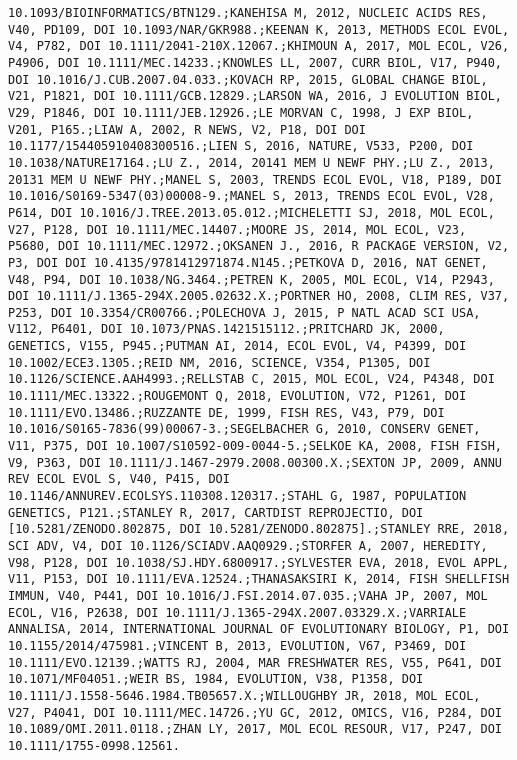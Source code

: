 \documentclass[]{article}
\begin{document}
\begin{verbatim}
10.1093/BIOINFORMATICS/BTN129.;KANEHISA M, 2012, NUCLEIC ACIDS RES, V40, PD109, DOI 10.1093/NAR/GKR988.;KEENAN K, 2013, METHODS ECOL EVOL, V4, P782, DOI 10.1111/2041-210X.12067.;KHIMOUN A, 2017, MOL ECOL, V26, P4906, DOI 10.1111/MEC.14233.;KNOWLES LL, 2007, CURR BIOL, V17, P940, DOI 10.1016/J.CUB.2007.04.033.;KOVACH RP, 2015, GLOBAL CHANGE BIOL, V21, P1821, DOI 10.1111/GCB.12829.;LARSON WA, 2016, J EVOLUTION BIOL, V29, P1846, DOI 10.1111/JEB.12926.;LE MORVAN C, 1998, J EXP BIOL, V201, P165.;LIAW A, 2002, R NEWS, V2, P18, DOI DOI 10.1177/154405910408300516.;LIEN S, 2016, NATURE, V533, P200, DOI 10.1038/NATURE17164.;LU Z., 2014, 20141 MEM U NEWF PHY.;LU Z., 2013, 20131 MEM U NEWF PHY.;MANEL S, 2003, TRENDS ECOL EVOL, V18, P189, DOI 10.1016/S0169-5347(03)00008-9.;MANEL S, 2013, TRENDS ECOL EVOL, V28, P614, DOI 10.1016/J.TREE.2013.05.012.;MICHELETTI SJ, 2018, MOL ECOL, V27, P128, DOI 10.1111/MEC.14407.;MOORE JS, 2014, MOL ECOL, V23, P5680, DOI 10.1111/MEC.12972.;OKSANEN J., 2016, R PACKAGE VERSION, V2, P3, DOI DOI 10.4135/9781412971874.N145.;PETKOVA D, 2016, NAT GENET, V48, P94, DOI 10.1038/NG.3464.;PETREN K, 2005, MOL ECOL, V14, P2943, DOI 10.1111/J.1365-294X.2005.02632.X.;PORTNER HO, 2008, CLIM RES, V37, P253, DOI 10.3354/CR00766.;POLECHOVA J, 2015, P NATL ACAD SCI USA, V112, P6401, DOI 10.1073/PNAS.1421515112.;PRITCHARD JK, 2000, GENETICS, V155, P945.;PUTMAN AI, 2014, ECOL EVOL, V4, P4399, DOI 10.1002/ECE3.1305.;REID NM, 2016, SCIENCE, V354, P1305, DOI 10.1126/SCIENCE.AAH4993.;RELLSTAB C, 2015, MOL ECOL, V24, P4348, DOI 10.1111/MEC.13322.;ROUGEMONT Q, 2018, EVOLUTION, V72, P1261, DOI 10.1111/EVO.13486.;RUZZANTE DE, 1999, FISH RES, V43, P79, DOI 10.1016/S0165-7836(99)00067-3.;SEGELBACHER G, 2010, CONSERV GENET, V11, P375, DOI 10.1007/S10592-009-0044-5.;SELKOE KA, 2008, FISH FISH, V9, P363, DOI 10.1111/J.1467-2979.2008.00300.X.;SEXTON JP, 2009, ANNU REV ECOL EVOL S, V40, P415, DOI 10.1146/ANNUREV.ECOLSYS.110308.120317.;STAHL G, 1987, POPULATION GENETICS, P121.;STANLEY R, 2017, CARTDIST REPROJECTIO, DOI [10.5281/ZENODO.802875, DOI 10.5281/ZENODO.802875].;STANLEY RRE, 2018, SCI ADV, V4, DOI 10.1126/SCIADV.AAQ0929.;STORFER A, 2007, HEREDITY, V98, P128, DOI 10.1038/SJ.HDY.6800917.;SYLVESTER EVA, 2018, EVOL APPL, V11, P153, DOI 10.1111/EVA.12524.;THANASAKSIRI K, 2014, FISH SHELLFISH IMMUN, V40, P441, DOI 10.1016/J.FSI.2014.07.035.;VAHA JP, 2007, MOL ECOL, V16, P2638, DOI 10.1111/J.1365-294X.2007.03329.X.;VARRIALE ANNALISA, 2014, INTERNATIONAL JOURNAL OF EVOLUTIONARY BIOLOGY, P1, DOI 10.1155/2014/475981.;VINCENT B, 2013, EVOLUTION, V67, P3469, DOI 10.1111/EVO.12139.;WATTS RJ, 2004, MAR FRESHWATER RES, V55, P641, DOI 10.1071/MF04051.;WEIR BS, 1984, EVOLUTION, V38, P1358, DOI 10.1111/J.1558-5646.1984.TB05657.X.;WILLOUGHBY JR, 2018, MOL ECOL, V27, P4041, DOI 10.1111/MEC.14726.;YU GC, 2012, OMICS, V16, P284, DOI 10.1089/OMI.2011.0118.;ZHAN LY, 2017, MOL ECOL RESOUR, V17, P247, DOI 10.1111/1755-0998.12561.

\end{verbatim}
\end{document}
